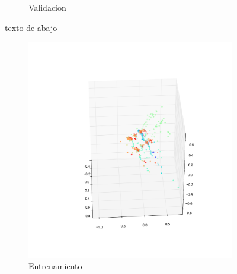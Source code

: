 \begin{figure}
\begin{subfigure}[b]{0.5\textwidth}
                \caption{Validacion}
                \label{fig: ej1_oja_3d_1_valid}
        \end{subfigure}
        \caption{texto de abajo}
        \label{fig: ej1_oja_3d_1}
\end{figure}

\begin{figure}
        \begin{subfigure}[b]{0.5\textwidth}
                \includegraphics[width=\linewidth]{secciones/graficos/oja/2_train.png}
                \caption{Entrenamiento}
                \label{fig: ej1_oja_3d_2_train}
        \end{subfigure}%
        \begin{subfigure}[b]{0.5\textwidth}

\end{subfigure}
\end{figure}
